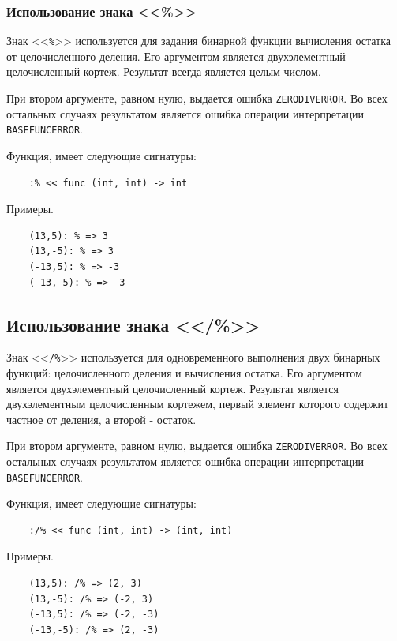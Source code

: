 \subsubsection{Использование знака <<\%>>}

Знак <<\verb|%|>> используется для задания бинарной функции вычисления остатка от целочисленного деления. Его аргументом является двухэлементный целочисленный кортеж. Результат всегда является целым числом.

При втором аргументе, равном нулю, выдается ошибка \verb|ZERODIVERROR|. Во всех остальных случаях результатом является ошибка операции интерпретации \verb|BASEFUNCERROR|.

Функция, имеет следующие сигнатуры:
\begin{verbatim}
    :% << func (int, int) -> int
\end{verbatim}

Примеры.
\begin{verbatim}
    (13,5): % => 3
    (13,-5): % => 3
    (-13,5): % => -3
    (-13,-5): % => -3
\end{verbatim}

\subsection{Использование знака <</\%>>}

Знак <<\verb|/%|>> используется для одновременного выполнения двух бинарных функций: целочисленного деления и  вычисления остатка. Его аргументом является двухэлементный целочисленный кортеж. Результат является двухэлементным целочисленным кортежем, первый элемент которого содержит частное от деления, а второй - остаток.

При втором аргументе, равном нулю, выдается ошибка \verb|ZERODIVERROR|. Во всех остальных случаях результатом является ошибка операции интерпретации \verb|BASEFUNCERROR|.

Функция, имеет следующие сигнатуры:
\begin{verbatim}
    :/% << func (int, int) -> (int, int)
\end{verbatim}

Примеры.
\begin{verbatim}
    (13,5): /% => (2, 3)
    (13,-5): /% => (-2, 3)
    (-13,5): /% => (-2, -3)
    (-13,-5): /% => (2, -3)
\end{verbatim}

